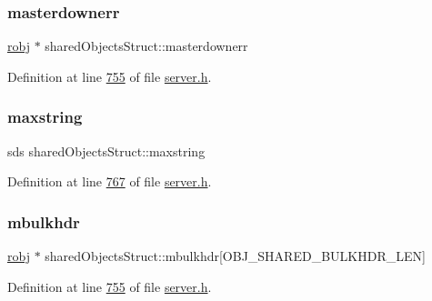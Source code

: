 \subsubsection{\texorpdfstring{masterdownerr}{masterdownerr}}
{\footnotesize\ttfamily \hyperlink{structredisObject}{robj} $\ast$ shared\+Objects\+Struct\+::masterdownerr}



Definition at line \hyperlink{server_8h_source_l00755}{755} of file \hyperlink{server_8h_source}{server.\+h}.

\mbox{\label{structsharedObjectsStruct_aa1b6d309d04ce6eafc2f14c59bb5e3b3}} 
\subsubsection{\texorpdfstring{maxstring}{maxstring}}
{\footnotesize\ttfamily sds shared\+Objects\+Struct\+::maxstring}



Definition at line \hyperlink{server_8h_source_l00767}{767} of file \hyperlink{server_8h_source}{server.\+h}.

\mbox{\label{structsharedObjectsStruct_ab474585241dc4e793842e3e6b476f0ab}} 
\subsubsection{\texorpdfstring{mbulkhdr}{mbulkhdr}}
{\footnotesize\ttfamily \hyperlink{structredisObject}{robj} $\ast$ shared\+Objects\+Struct\+::mbulkhdr\mbox{[}O\+B\+J\+\_\+\+S\+H\+A\+R\+E\+D\+\_\+\+B\+U\+L\+K\+H\+D\+R\+\_\+\+L\+EN\mbox{]}}



Definition at line \hyperlink{server_8h_source_l00755}{755} of file \hyperlink{server_8h_source}{server.\+h}.

\mbox{\label{structsharedObjectsStruct_a6b36425b0eda82117b19f5a26def565e}} 
